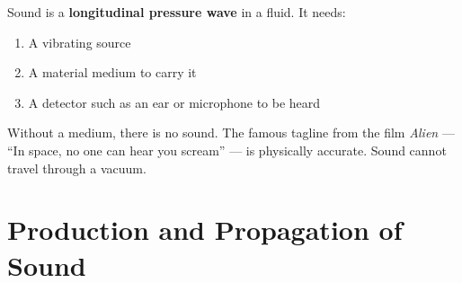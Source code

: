 Sound is a \textbf{longitudinal pressure wave} in a
fluid. It needs:
\begin{enumerate}[noitemsep]
  \item A vibrating source
  \item A material medium to carry it
  \item A detector such as an ear or microphone to be heard
\end{enumerate}

Without a medium, there is no sound. The famous
tagline from the film \textit{Alien} --- ``In space,
no one can hear you scream'' --- is physically accurate.
Sound cannot travel through a vacuum.

\section{Production and Propagation of Sound}

